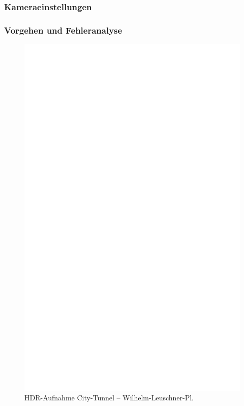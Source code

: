 \documentclass[liststotoc,bibtotoc,fontsize=14pt,]{scrreprt}
\begin{document}
	\subsubsection{Kameraeinstellungen}
		

	
	\subsubsection{Vorgehen und Fehleranalyse}


			 \newpage
			 \begin{figure}[h]
			 	\includegraphics[width=\linewidth]{img/ph.jpg}
			 	\caption{HDR-Aufnahme City-Tunnel -- Wilhelm-Leuschner-Pl. }
			 \end{figure}
\end{document}
